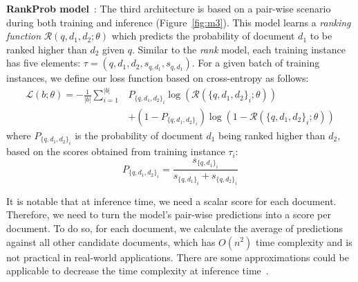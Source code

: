 \documentclass[sigconf]{acmart}
\newcommand{\Modelthree}{Rank\-Prob model\xspace}
\newcommand{\modeltwo}{\textit{rank} model\xspace}
\newcommand{\sshrink}{\vspace{-.80ex}}
\newcommand{\mypar}[1]{\vspace*{-0.1ex}\medskip\noindent\textbf{#1}~}
\begin{document}
\mypar{\Modelthree}:
The third architecture is based on a pair-wise scenario during both training and inference (Figure~\ref{fig:m3}). This model learns a \emph{ranking function} $\mathcal{R}(q, d_1, d_2; \theta)$ which predicts the probability of document $d_1$ to be ranked higher than $d_2$ given $q$.
Similar to the \modeltwo, each training instance has five elements: $\tau = (q,d_1, d_2, s_{q,d_1}, s_{q,d_1})$.
For a given batch of training instances, we define our loss function based on cross-entropy as follows:
\begin{align}
\mathcal{L}(b; \theta) = -\frac{1}{|b|}
\sum_{i=1}^{|b|} &
P_{\{q,d_1,d_2\}_i} \log(\mathcal{R}(\{q,d_1,d_2\}_i; \theta)) \\
&
+ (1- P_{\{q,d_1,d_2\}_i})\log(1- \mathcal{R}(\{q,d_1,d_2\}_i; \theta)) \nonumber
\end{align}
where $P_{\{q,d_1,d_2\}_i}$ is the probability of document $d_1$ being ranked higher than $d_2$, based on the scores obtained from training instance $\tau_i$:
\begin{equation}
P_{\{q,d_1,d_2\}_i} = \frac{s_{\{q,d_1\}_i}}{s_{\{q,d_1\}_i} + s_{\{q,d_2\}_i}}
\end{equation}

It is notable that at inference time, we need a scalar score for each document. Therefore, we need to turn the model's pair-wise predictions into a score per document. To do so, for each document, we calculate the average of predictions against all other candidate documents, which has $O(n^2)$ time complexity and is not practical in real-world applications. There are some approximations could be applicable to decrease the time complexity at inference time~\citep{Wauthier:2013}.

\sshrink
\end{document}
